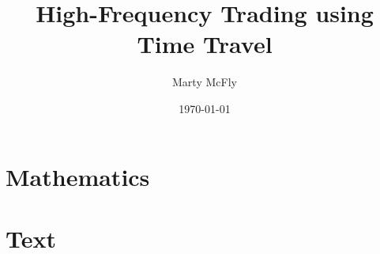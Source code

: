 \documentclass[
    ]{vegaarticle}
\title{High-Frequency Trading using Time Travel}
\author[1]{Marty McFly}
\affil[1]{University of Time Travel}
\date{\today}
\begin{document}
    \maketitle

    \begin{abstract}
        \blindtext
    \end{abstract}

    \introduction 
    \blindtext

    \blindrandomtrue

    \blindmathtrue

    \section{Mathematics}
    \blindmathpaper

    \section{Text}
    \Blinddescription

    \blindmathfalse
    \conclusion
    \Blindenumerate

\end{document}
